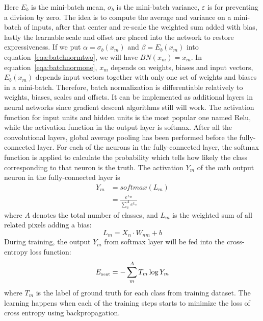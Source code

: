 Here \(E_b \) is the mini-batch mean,
\(\sigma_b \) is the mini-batch variance,
\(\varepsilon \) is for preventing a division by zero.
The idea is to compute the average and variance on a 
mini-batch of inputs, after that center and re-scale
the weighted sum added with bias, lastly the
learnable scale and offset are placed into
the network to restore expressiveness.
If we put \(\alpha = \sigma_b(x_m)\) and 
\(\beta = E_b(x_m)\) into 
equation~\ref{eqa:batchnormtwo},
we will have \(BN(x_m) = x_m\).
In equation~\ref{eqa:batchnormone},
\(x_m\) depends on weights, biases and 
input vectors, \(E_b(x_m)\) depends 
input vectors together with
only one set of weights and biases
in a mini-batch.
Therefore, batch normalization is differentiable 
relatively 
to weights, biases, scales and offsets.
It can be implemented as additional layers in neural networks
since gradient descent algorithms still will work.
% 
The activation function for input units 
and hidden units 
is the most popular one named Relu, while the 
activation function in the output layer is 
softmax.
After all the convolutional layers, global average pooling
has been performed before the fully-connected layer.
For each of the neurons in the fully-connected layer,
the softmax function is applied to calculate 
the probability which tells how likely
the class corresponding to that neuron is the truth.
The activation \(Y_m\) of the \(m\)th output neuron in the 
fully-connected layer is
\begin{align}
    Y_m &= softmax(L_m)\\ 
        &= \displaystyle\frac{e^{L_m}}{\displaystyle\sum_{a}^{A} e^{L_a}}
\end{align}
where \(A\) denotes the total number of classes, and \(L_m\) is 
the weighted sum of all related pixels adding a bias:
\begin{equation}
    L_m = X_n\cdot W_{nm} + b
\end{equation}
During training, the output \(Y_m\) from softmax layer
will be fed into the cross-entropy loss function:
\begin{equation}
    \label{eq:entropy}
    E_{\mbox{\tiny xent}} = -\sum_{m}^{A} T_m \log Y_m
\end{equation}
where \(T_m\) is the label of ground truth for
each class from training dataset.
The learning happens when each of the training steps 
starts to minimize the loss of cross entropy
using backpropagation.

